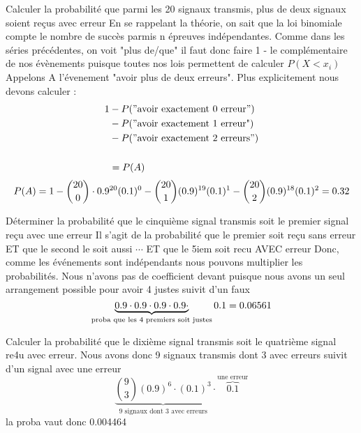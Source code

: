 \begin{exo}
  \begin{subexo}{Calculer la probabilité que parmi les 20 signaux transmis, plus de deux
      signaux soient reçus avec erreur }
    En se rappelant la théorie, on sait que la loi binomiale compte le nombre de succès
    parmis n épreuves indépendantes.
    Comme dans les séries précédentes, on voit "plus de/que" il faut donc faire
    1 - le complémentaire de nos évènements puisque toutes nos lois permettent de calculer
    $P(X < x_i)$
    Appelons A l'évenement "avoir plus de deux erreurs".
    Plus explicitement nous devons calculer :
    \begin{align*}
      1 & - P("\text{avoir exactement 0 erreur}")  \\
        & - P("\text{avoir exactement 1 erreur"})  \\
        & - P("\text{avoir exactement 2 erreurs}") \\
      \\
        & = P(A)
    \end{align*}
    \[
      P(A) = 1 - \binom{20}{0} \cdot 0.9^{20}(0.1)^0
      - \binom{20}{1}(0.9)^{19}(0.1)^1
      - \binom{20}{2}(0.9)^{18}(0.1)^{2}
      \\ = 0.32
    \]
  \end{subexo}
  \begin{subexo}{Déterminer la probabilité que le cinquième signal transmis soit le premier signal reçu avec une erreur}
    Il s'agit de la probabilité que le premier soit reçu sans erreur ET que le second le soit aussi $\cdots$ ET que le 5iem soit recu AVEC erreur
    Donc, comme les événements sont indépendants nous pouvons multiplier les probabilités.
    Nous n'avons pas de coefficient devant puisque nous avons un seul arrangement possible
    pour avoir 4 justes suivit d'un faux
    \[
      \underbrace{0.9 \cdot 0.9 \cdot 0.9 \cdot 0.9 \cdot}_{\text{proba que les 4 premiers soit justes}} 0.1
      \\ = 0.06561
    \]

  \end{subexo}
  \begin{subexo}{Calculer la probabilité que le dixième signal
      transmis soit le quatrième signal re4u avec erreur.}
    Nous avons donc 9 signaux transmis dont 3 avec erreurs suivit d'un signal avec une erreur
    \[
      \underbrace{\binom{9}{3}(0.9)^6 \cdot (0.1)^3}_{\text{9 signaux dont 3 avec erreurs}} 
      \cdot \overbrace{0.1}^{\text{une erreur}}
    \]
    la proba vaut donc 0.004464
  \end{subexo}
\end{exo}
